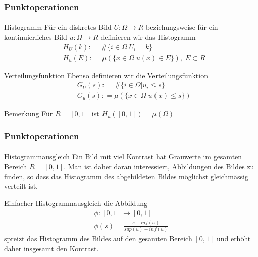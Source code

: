 \documentclass{beamer}
\begin{document}
\begin{frame}
    \frametitle{Punktoperationen}
\framesubtitle{}

    \begin{block}{Histogramm}
Für ein diskretes Bild $U : \Omega \to R$ beziehungsweise für ein kontinuierliches Bild $u: \Omega \to R$  definieren wir das Histogramm 
\begin{align*}
& H_U (k): = \#\{  i \in \Omega | U_i = k \} \\
& H_u (E): = \mu (\{  x \in \Omega |  u(x) \in  E \} ), \; E \subset R 
\end{align*}
\end{block}

    \begin{block}{Verteilungsfunktion}
Ebenso definieren wir die Verteilungsfunktion
\begin{align*}
& G_U (s): = \# \{  i \in \Omega |  u_i \leq  s \} \\
& G_u (s): = \mu ( \{  x \in \Omega |  u(x) \leq  s \} )
\end{align*}
\end{block}


    \begin{block}{Bemerkung}
Für $R = [0,1]$ ist
$H_u ([0,1])= \mu (\Omega)$
\end{block}


 \end{frame}



\begin{frame}
    \frametitle{Punktoperationen}
\framesubtitle{}

    \begin{block}{Histogrammausgleich}
Ein Bild mit viel Kontrast hat Grauwerte im gesamten Bereich $R = [0,1]$. Man ist daher daran interessiert, Abbildungen des Bildes zu finden, so  dass das Histogramm des abgebildeten 
Bildes möglichst gleichmässig verteilt ist.  
\end{block}

   \begin{block}{Einfacher Histogrammausgleich}
die Abbildung  
 \begin{align*}
\phi : [0,1] \to [0,1] \\
\phi(s) = \frac{s -inf(u)}{sup(u) - inf(u)}
\end{align*}
spreizt das Histogramm des Bildes auf den gesamten Bereich $[0,1]$ und erhöht daher insgesamt den Kontrast.
\end{block}

 \end{frame}
\end{document}
